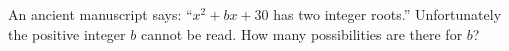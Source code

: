 An ancient manuscript says: ``$x^2+bx+30$ has two integer roots.'' Unfortunately the positive integer $b$ cannot be read. How many possibilities are there for $b$?
